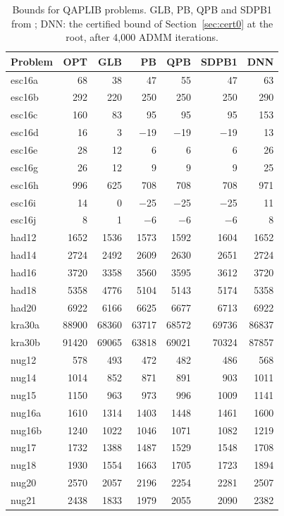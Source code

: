 \documentclass[11pt]{article}
\theoremstyle{remark}
\begin{document}
\begin{table}[p]\centering
\caption{Bounds for QAPLIB problems. GLB, PB, QPB and SDPB1 from
\cite[Table~1]{ab01}; DNN: the certified bound of Section~\ref{sec:cert0} at the
root, after 4,000 ADMM iterations.}\label{tab:bounds}
\small
\begin{tabular}{lrrrrrr}
\toprule
Problem & OPT & GLB & PB & QPB & SDPB1 & DNN\\
\midrule
esc16a & 68 & 38 & 47 & 55 & 47 & 63\\
esc16b & 292 & 220 & 250 & 250 & 250 & 290\\
esc16c & 160 & 83 & 95 & 95 & 95 & 153\\
esc16d & 16 & 3 & $-$19 & $-$19 & $-$19 & 13\\
esc16e & 28 & 12 & 6 & 6 & 6 & 26\\
esc16g & 26 & 12 & 9 & 9 & 9 & 25\\
esc16h & 996 & 625 & 708 & 708 & 708 & 971\\
esc16i & 14 & 0 & $-$25 & $-$25 & $-$25 & 11\\
esc16j & 8 & 1 & $-$6 & $-$6 & $-$6 & 8\\
\midrule
had12 & 1652 & 1536 & 1573 & 1592 & 1604 & 1652\\
had14 & 2724 & 2492 & 2609 & 2630 & 2651 & 2724\\
had16 & 3720 & 3358 & 3560 & 3595 & 3612 & 3720\\
had18 & 5358 & 4776 & 5104 & 5143 & 5174 & 5358\\
had20 & 6922 & 6166 & 6625 & 6677 & 6713 & 6922\\
\midrule
kra30a & 88900 & 68360 & 63717 & 68572 & 69736 & 86837\\
kra30b & 91420 & 69065 & 63818 & 69021 & 70324 & 87857\\
\midrule
nug12 & 578 & 493 & 472 & 482 & 486 & 568\\
nug14 & 1014 & 852 & 871 & 891 & 903 & 1011\\
nug15 & 1150 & 963 & 973 & 996 & 1009 & 1141\\
nug16a & 1610 & 1314 & 1403 & 1448 & 1461 & 1600\\
nug16b & 1240 & 1022 & 1046 & 1071 & 1082 & 1219\\
nug17 & 1732 & 1388 & 1487 & 1529 & 1548 & 1708\\
nug18 & 1930 & 1554 & 1663 & 1705 & 1723 & 1894\\
nug20 & 2570 & 2057 & 2196 & 2254 & 2281 & 2507\\
nug21 & 2438 & 1833 & 1979 & 2055 & 2090 & 2382\\

\end{tabular}
\end{table}
\end{document}
